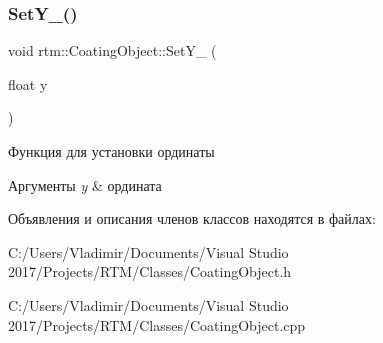 \subsubsection{\texorpdfstring{Set\+Y\+\_\+()}{SetY\_()}}
{\footnotesize\ttfamily void rtm\+::\+Coating\+Object\+::\+Set\+Y\+\_\+ (\begin{DoxyParamCaption}\item[{float}]{y }\end{DoxyParamCaption})\hspace{0.3cm}{\ttfamily [private]}}

Функция для установки ординаты 
\begin{DoxyParams}{Аргументы}
{\em y} & ордината \\
\hline
\end{DoxyParams}


Объявления и описания членов классов находятся в файлах\+:\begin{DoxyCompactItemize}
\item 
C\+:/\+Users/\+Vladimir/\+Documents/\+Visual Studio 2017/\+Projects/\+R\+T\+M/\+Classes/Coating\+Object.\+h\item 
C\+:/\+Users/\+Vladimir/\+Documents/\+Visual Studio 2017/\+Projects/\+R\+T\+M/\+Classes/Coating\+Object.\+cpp\end{DoxyCompactItemize}
